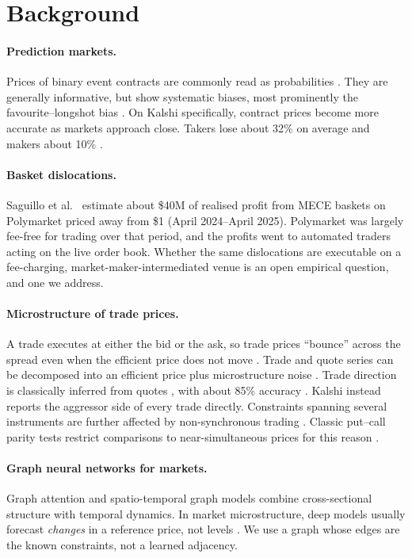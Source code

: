 \documentclass[11pt,a4paper]{article}
\begin{document}
\section{Background}

\paragraph{Prediction markets.} Prices of binary event contracts are commonly read
as probabilities \cite{wolfers2004}. They are generally informative, but show
systematic biases, most prominently the favourite--longshot bias
\cite{snowberg2010}. On Kalshi specifically, contract prices become more accurate
as markets approach close. Takers lose about 32\% on average and makers about
10\% \cite{burgi2025}.

\paragraph{Basket dislocations.} Saguillo et al.~\cite{saguillo2025} estimate about \$40M of realised profit from MECE baskets on
Polymarket priced away from \$1 (April 2024--April 2025). Polymarket was largely
fee-free for trading over that period, and the profits went to automated traders
acting on the live order book. Whether the same dislocations are executable on a
fee-charging, market-maker-intermediated venue is an open empirical question,
and one we address.

\paragraph{Microstructure of trade prices.} A trade executes at either the bid or
the ask, so trade prices ``bounce'' across the spread even when the efficient price
does not move \cite{roll1984}. Trade and quote series can be decomposed into an
efficient price plus microstructure noise \cite{hansen2006}. Trade direction is
classically inferred from quotes \cite{lee1991}, with about 85\% accuracy
\cite{oddswhite2000}. Kalshi instead reports the aggressor side of every trade
directly. Constraints spanning several instruments are further affected by
non-synchronous trading \cite{lomackinlay1990}. Classic put--call parity tests
restrict comparisons to near-simultaneous prices for this reason
\cite{klemkosky1979, kamara1995}.

\paragraph{Graph neural networks for markets.} Graph attention
\cite{velickovic2018} and spatio-temporal graph models \cite{yu2018stgcn} combine
cross-sectional structure with temporal dynamics. In market microstructure,
deep models usually forecast \emph{changes} in a reference price, not levels
\cite{zhang2019deeplob}. We use a graph whose edges are the known constraints,
not a learned adjacency.
\end{document}
